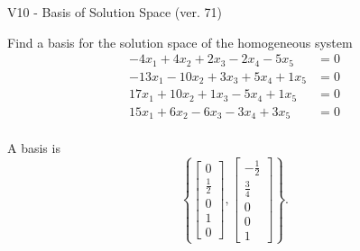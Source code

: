 \begin{exercise}
  \begin{exerciseTitle}V10 - Basis of Solution Space (ver. 71)\end{exerciseTitle}
  \begin{exerciseStatement}
    Find a basis for the solution space of the homogeneous system 
\begin{align*}
 -4 x_ 1 + 4 x_ 2 + 2 x_ 3 -2 x_ 4 -5 x_ 5 &= 0  \\ 
  -13 x_ 1 -10 x_ 2 + 3 x_ 3 + 5 x_ 4 + 1 x_ 5 &= 0  \\ 
  17 x_ 1 + 10 x_ 2 + 1 x_ 3 -5 x_ 4 + 1 x_ 5 &= 0  \\ 
  15 x_ 1 + 6 x_ 2 -6 x_ 3 -3 x_ 4 + 3 x_ 5 &= 0  \\ 
 \end{align*}


 
  \end{exerciseStatement}

  \begin{exerciseAnswer}
   A basis is   
\[\left\{\left[\begin{array}{c}
0 \\
\frac{1}{2} \\
0 \\
1 \\
0
\end{array}\right] , \left[\begin{array}{c}
-\frac{1}{2} \\
\frac{3}{4} \\
0 \\
0 \\
1
\end{array}\right]\right\}.\]

  


  \end{exerciseAnswer}
\end{exercise}